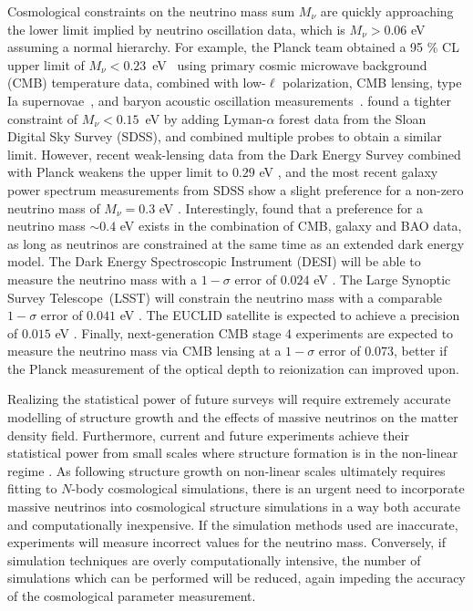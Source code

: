 \documentclass[useAMS, usenatbib]{mnras}
\begin{document}
Cosmological constraints on the neutrino mass sum $M_\nu$ are quickly approaching the lower limit implied by neutrino oscillation data, which is $M_\nu > 0.06$ eV assuming a normal hierarchy. For example, the Planck team obtained a 95 \% CL upper limit of $M_\nu<0.23$~eV~\citep{planck2015xiii} using primary cosmic microwave background (CMB) temperature data, combined with low-$\ell$ polarization, CMB lensing, type Ia supernovae~\citep{Betoule_2014}, and baryon acoustic oscillation
measurements~\citep{Beutler_2011, Anderson_2014, Ross_2015}. \cite{Palanque_2015} found a tighter constraint of $M_\nu<0.15$~eV by adding Lyman-$\alpha$ forest data from the Sloan Digital Sky Survey (SDSS), and \cite{Vagnozzi:2017} combined multiple probes to obtain a similar limit. However, recent weak-lensing data from the Dark Energy Survey combined with Planck weakens the upper limit to $0.29$ eV \citep{DES_2017}, and the most recent galaxy power spectrum measurements from SDSS show a slight preference for a non-zero neutrino mass of $M_\nu = 0.3$ eV \citep{Beutler_2014}. Interestingly, \cite{Poulin:2018} found that a preference for a neutrino mass $\sim 0.4$ eV exists in the combination of CMB, galaxy and BAO data, as long as neutrinos are constrained at the same time as an extended dark energy model.
The Dark Energy Spectroscopic Instrument (DESI) \citep{DESI} will be able to measure the neutrino mass with a $1-\sigma$ error of $0.024$ eV \citep{FontRibera:2014}. The Large Synoptic Survey Telescope~(LSST) \citep{LSST, Joudaki_2012} will constrain the neutrino mass with a comparable $1-\sigma$ error of $0.041$ eV \citep{Banerjee:2018}. The EUCLID satellite is expected to achieve a precision of $0.015$ eV \citep{Basse:2014}. Finally, next-generation CMB stage 4 experiments are expected to measure the neutrino mass via CMB lensing at a $1-\sigma$ error of $0.073$, better if the Planck measurement of the optical depth to reionization can improved upon\citep{Abazajian_16, Archidiacono:2017}.

Realizing the statistical power of future surveys will require extremely accurate modelling of structure growth and the effects of massive neutrinos on the matter density field.
Furthermore, current and future experiments achieve their statistical power from small scales where structure formation is in the non-linear regime \citep[e.g.~][]{Troxel_2017, HSC_2017}.
As following structure growth on non-linear scales ultimately requires fitting to $N$-body cosmological simulations, there is an urgent need to incorporate massive neutrinos into cosmological structure simulations
in a way both accurate and computationally inexpensive.
If the simulation methods used are inaccurate, experiments will measure incorrect values for the neutrino mass.
Conversely, if simulation techniques are overly computationally intensive, the number of simulations which can be performed will be reduced, again impeding the accuracy of the cosmological parameter measurement.
\end{document}
